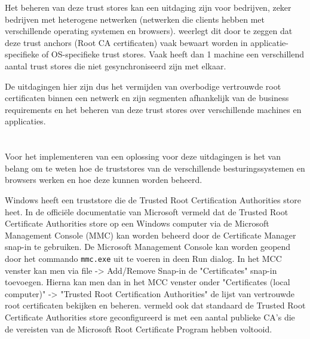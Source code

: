 Het beheren van deze trust stores kan een uitdaging zijn voor bedrijven, zeker bedrijven met heterogene netwerken (netwerken die clients hebben met verschillende operating systemen en browsers).
\textcite{rfc6024} weerlegt dit door te zeggen dat deze trust anchors (Root CA certificaten) vaak bewaart worden in applicatie-specifieke of OS-specifieke trust stores.
Vaak heeft dan 1 machine een verschillend aantal trust stores die niet gesynchroniseerd zijn met elkaar. \break

De uitdagingen hier zijn dus het vermijden van overbodige vertrouwde root certificaten binnen een netwerk en zijn segmenten afhankelijk van de business requirements en het beheren van deze trust stores over verschillende machines en applicaties. 

\section{}%
\label{sec:Verschillende truststores}

Voor het implementeren van een oplossing voor deze uitdagingen is het van belang om te weten hoe de truststores van de verschillende besturingssystemen en browsers werken en hoe deze kunnen worden beheerd. \break

Windows heeft een truststore die de Trusted Root Certification Authorities store heet.
In de officiële documentatie van Microsoft vermeld \textcite{MStruststore} dat de Trusted Root Certificate Authorities store op een Windows computer via de Microsoft Management Console (MMC) kan worden beheerd door de Certificate Manager snap-in te gebruiken.
De Microsoft Management Console kan worden geopend door het commando \texttt{mmc.exe} uit te voeren in deen Run dialog. In het MCC venster kan men via file -> Add/Remove Snap-in de "Certificates" snap-in toevoegen.
Hierna kan men dan in het MCC venster onder "Certificates (local computer)" -> "Trusted Root Certification Authorities" de lijst van vertrouwde root certificaten bekijken en beheren.
\textcite{MStruststore} vermeld ook dat standaard de Trusted Root Certificate Authorities store geconfigureerd is met een aantal publieke CA's die de vereisten van de Microsoft Root Certificate Program hebben voltooid. \break

